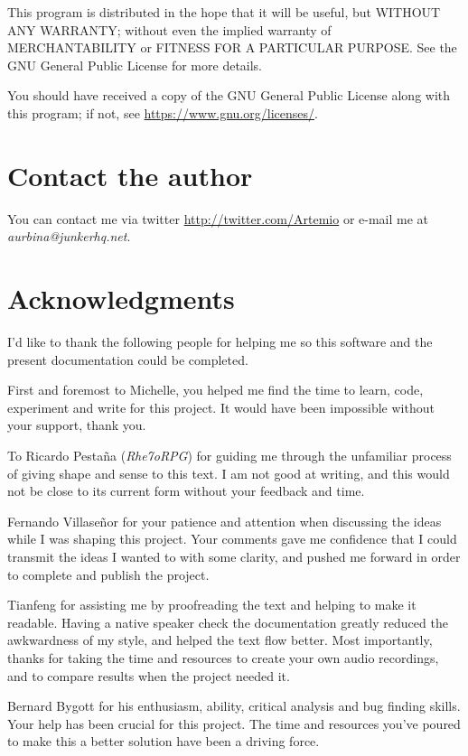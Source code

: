 \documentclass[10pt,a4paper]{report}
\begin{document}
\begin{appendices}
This program is distributed in the hope that it will be useful,
but WITHOUT ANY WARRANTY; without even the implied warranty of
MERCHANTABILITY or FITNESS FOR A PARTICULAR PURPOSE.  See the
GNU General Public License for more details.

You should have received a copy of the GNU General Public License
along with this program; if not, see \url{https://www.gnu.org/licenses/}.

\chapter{Contact the author}
\label{contact}

You can contact me via twitter \url{http://twitter.com/Artemio} or e-mail me at \textit{aurbina@junkerhq.net}.

\chapter{Acknowledgments}

I'd like to thank the following people for helping me so this software and the present documentation could be completed. 

First and foremost to Michelle, you helped me find the time to learn, code, experiment and write for this project. It would have been impossible without your support, thank you.

To Ricardo Pestaña (\textit{Rhe7oRPG}) for guiding me through the unfamiliar process of giving shape and sense to this text. I am not good at writing, and this would not be close to its current form without your feedback and time.

Fernando Villaseñor for your patience and attention when discussing the ideas while I was shaping this project. Your comments gave me confidence that I could transmit the ideas I wanted to with some clarity, and pushed me forward in order to complete and publish the project.

Tianfeng for assisting me by proofreading the text and helping to make it readable. Having a native speaker check the documentation greatly reduced the awkwardness of my style, and helped the text flow better. Most importantly, thanks for taking the time and resources to create your own audio recordings, and to compare results when the project needed it.

Bernard Bygott for his enthusiasm, ability, critical analysis and bug finding skills. Your help has been crucial for this project. The time and resources you've poured to make this a better solution have been a driving force.


\end{appendices}
\end{document}
